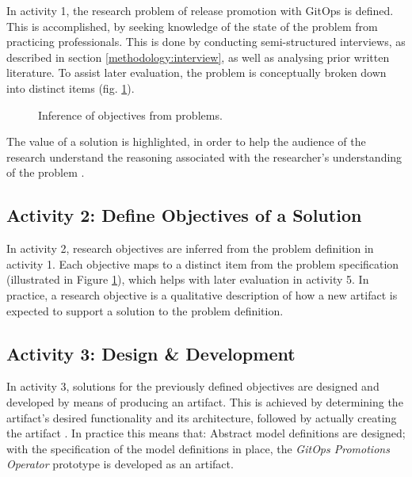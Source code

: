 In activity 1,
the research problem of
release promotion with GitOps
is defined.
This is accomplished, by
seeking knowledge of the state of the problem
from practicing professionals.
This is done by conducting
semi-structured interviews, as described in section \ref{methodology:interview},
as well as analysing prior written literature.
To assist later evaluation,
the problem is conceptually broken down into distinct items (fig. \ref{fig:problemToObjectiveMapping}).

\begin{figure}[h]
	\centering
	\caption{Inference of objectives from problems.
	}
	\label{fig:problemToObjectiveMapping}	
\end{figure}

The value of a solution is highlighted,
in order to help the audience of the research
understand the reasoning associated with the
researcher's understanding of the problem
\autocite{designScienceResearchMethodologyForInformationSystemsResearch}.


\subsection{Activity 2: Define Objectives of a Solution}
\label{methodology:activity2}

In activity 2,
research objectives are inferred from the problem definition in activity 1.
Each objective maps to a distinct item from the problem specification
(illustrated in Figure \ref{fig:problemToObjectiveMapping}),
which helps with later evaluation in activity 5.
In practice, a research objective is a qualitative description of
how a new artifact is expected to support a solution to the problem definition.
\bigskip

\subsection{Activity 3: Design \& Development}
\label{methodology:activity3}

\noindent
In activity 3,
solutions for the previously defined objectives are designed and developed
by means of producing an artifact.
This is achieved by
determining the artifact's desired functionality and its architecture,
followed by actually creating the artifact
\autocite{designScienceResearchMethodologyForInformationSystemsResearch}.
In practice this means that:
Abstract model definitions are designed;
with the specification of the model definitions in place,
the \textit{GitOps Promotions Operator} prototype is developed as an artifact.
\bigskip

